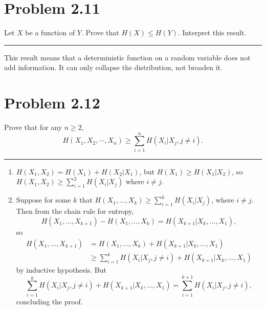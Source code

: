 \documentclass{article}
\newcommand{\horline}
           {\begin{center}
              \noindent\rule{8cm}{0.4pt}
            \end{center}}
\begin{document}
\section*{Problem 2.11}
Let $X$ be a function of $Y$. Prove that $H(X) \leq H(Y)$. Interpret this
result.
\horline 

This result means that a deterministic function on a random variable does
not add information. It can only collapse the distribution, not broaden it.

\section*{Problem 2.12}
Prove that for any $n \geq 2$,
$$
H(X_1, X_2, \cdots, X_n) \geq \sum_{i=1}^{n} H(X_i | X_j, j \neq i).
$$
\horline
\begin{enumerate}
  \item{$H(X_1, X_2) = H(X_1) + H(X_2 | X_1)$, but 
        $H(X_1) \geq H(X_1 | X_2)$, so 
        $H(X_1, X_2) \geq \sum_{i=1}^2 H(X_i | X_j)$ where $i \neq j$.}
  \item{Suppose for some $k$ that 
        $H(X_1, \dots, X_k) \geq \sum_{i=1}^k H(X_i | X_j)$, where
        $i \neq j$. Then from the chain rule for entropy,
        $$
        H(X_1, \dots, X_{k+1}) - H(X_1, \dots, X_k)
         = H(X_{k+1} | X_k, \dots, X_1),         
        $$
        so 
        \begin{align*}
        H(X_1, \dots, X_{k+1}) 
          & =    H(X_1, \dots, X_k) + H(X_{k+1} | X_k, \dots, X_1) \\
          & \geq \sum_{i=1}^k H(X_i | X_j, j \neq i) 
                  + H(X_{k+1} | X_k, \dots, X_1)
        \end{align*}
        by inductive hypothesis. But
        $$
        \sum_{i=1}^k H(X_i | X_j, j \neq i) + H(X_{k+1} | X_k, \dots, X_1) 
        = \sum_{i=1}^{k+1} H(X_i | X_j, j \neq i),
        $$
        concluding the proof.
        }
\end{enumerate}
\end{document}
